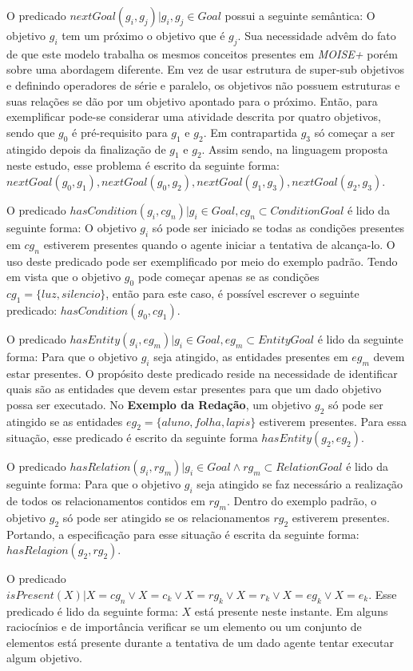 O predicado $nextGoal(g_i,g_j) |g_i, g_j \in Goal$ possui a seguinte semântica: O objetivo $g_i$ tem um próximo o objetivo que é $g_j$. Sua necessidade advêm do fato de que este modelo trabalha os mesmos conceitos presentes em \textit{MOISE+} porém sobre uma abordagem diferente. Em vez de usar estrutura de super-sub objetivos e definindo operadores de série e paralelo, os objetivos não possuem estruturas e suas relações se dão por um objetivo apontado para o próximo. Então, para exemplificar pode-se considerar uma atividade descrita por quatro objetivos, sendo que $g_0$ é pré-requisito para $g_1$ e $g_2$. Em contrapartida $g_3$ só começar a ser atingido depois da finalização de $g_1$ e $g_2$. Assim sendo, na linguagem proposta neste estudo, esse problema é escrito da seguinte forma: $nextGoal(g_0,g_1), nextGoal(g_0,g_2), nextGoal(g_1,g_3), nextGoal(g_2,g_3)$.

O predicado $hasCondition(g_i,cg_n) | g_i \in Goal, cg_n \subset ConditionGoal$ é lido da seguinte forma: O objetivo $g_i$ só pode ser iniciado se todas as condições presentes em $cg_n$ estiverem presentes quando o agente iniciar a tentativa de alcança-lo. O uso deste predicado pode ser exemplificado por meio do exemplo padrão. Tendo em vista que o objetivo $g_0$ pode começar apenas se as condições $cg_1 = \{ luz, silencio \}$, então para este caso, é possível escrever o seguinte predicado: $hasCondition(g_0,cg_1)$.

O predicado $hasEntity(g_i,eg_m) | g_i \in Goal, eg_m \subset EntityGoal $ é lido da seguinte forma: Para que o objetivo $g_i$ seja atingido, as entidades presentes em $eg_m$ devem estar presentes. O propósito deste predicado reside na necessidade de identificar quais são as entidades que devem estar presentes para que um dado objetivo possa ser executado. No \textbf{Exemplo da Redação}, um objetivo $g_2$ só pode ser 
atingido se as entidades $eg_2 = \{ aluno, folha, lapis\}$ estiverem presentes. Para essa situação, esse predicado é escrito da seguinte forma $hasEntity(g_2,eg_2)$.

O predicado $hasRelation(g_i,rg_m) | g_i \in Goal \wedge rg_m \subset RelationGoal $ é lido da seguinte forma: Para que o objetivo $g_i$ seja atingido se faz necessário a realização de todos os relacionamentos contidos em $rg_m$. Dentro do exemplo padrão, o objetivo $g_2$ só pode ser atingido se os relacionamentos $rg_2$ estiverem presentes. Portando, a especificação para esse situação é escrita da seguinte forma: $hasRelagion(g_2,rg_2)$.

O predicado $isPresent(X) | X = cg_n \vee X = c_k \vee  X = rg_k \vee X = r_k \vee X = eg_k \vee X = e_k $. Esse predicado é lido da seguinte forma: $X$ está presente neste instante. Em alguns raciocínios e de importância verificar se um elemento ou um conjunto de elementos está presente durante a tentativa de um dado agente tentar executar algum objetivo.

